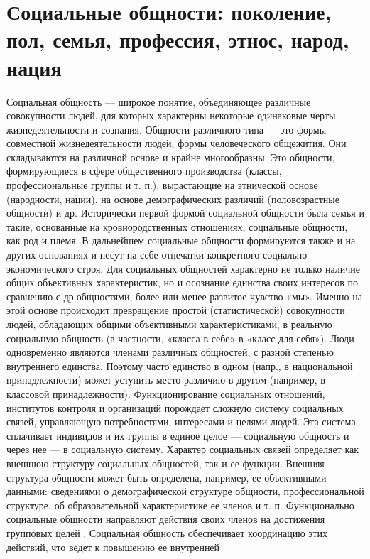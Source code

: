 \documentclass[12pt]{article}
\begin{document}
\section{Социальные общности: поколение, пол, семья, профессия, этнос, народ, нация}
Социальная  общность  —  широкое  понятие,  объединяющее  различные  совокупности  людей,  для  которых
характерны некоторые одинаковые черты жизнедеятельности и сознания.
Общности  различного  типа  —  это  формы  совместной  жизнедеятельности  людей,  формы  человеческого
общежития. Они складываются на различной основе и крайне многообразны. Это общности, формирующиеся в
сфере общественного производства (классы, профессиональные группы и т. п.), вырастающие на этнической
основе (народности, нации), на основе демографических различий (половозрастные общности) и др.
Исторически первой формой социальной общности была семья и такие, основанные на кровнородственных
отношениях, социальные общности, как род и племя. В дальнейшем социальные общности формируются также
и на других основаниях и несут на себе отпечатки конкретного социально-экономического строя.
Для социальных общностей характерно не только наличие общих объективных характеристик, но и осознание
единства своих интересов по сравнению с др.общностями, более или менее развитое чувство «мы». Именно на
этой основе происходит превращение простой (статистической) совокупности людей, обладающих общими
объективными характеристиками, в реальную социальную общность (в частности, «класса в себе» в «класс для
себя»).
Люди  одновременно  являются  членами  различных  общностей,  с  разной  степенью  внутреннего  единства.
Поэтому часто единство в одном (напр., в национальной принадлежности) может уступить место различию в
другом (например, в классовой принадлежности).
Функционирование социальных отношений, институтов контроля и организаций порождает сложную систему
социальных связей, управляющую потребностями, интересами и целями людей. Эта система сплачивает 
индивидов и их группы в единое целое --- социальную общность и через нее --- в социальную систему. Характер
социальных связей определяет как внешнюю структуру социальных общностей, так и ее функции. Внешняя
структура  общности  может  быть  определена,  например,  ее  объективными  данными:  сведениями  о
демографической структуре общности, профессиональной структуре, об образовательной характеристике ее
членов и т. п.
Функционально социальные общности направляют действия своих членов на достижения групповых целей .
Социальная  общность  обеспечивает  координацию  этих  действий, что ведет  к  повышению  ее  внутренней
\end{document}
